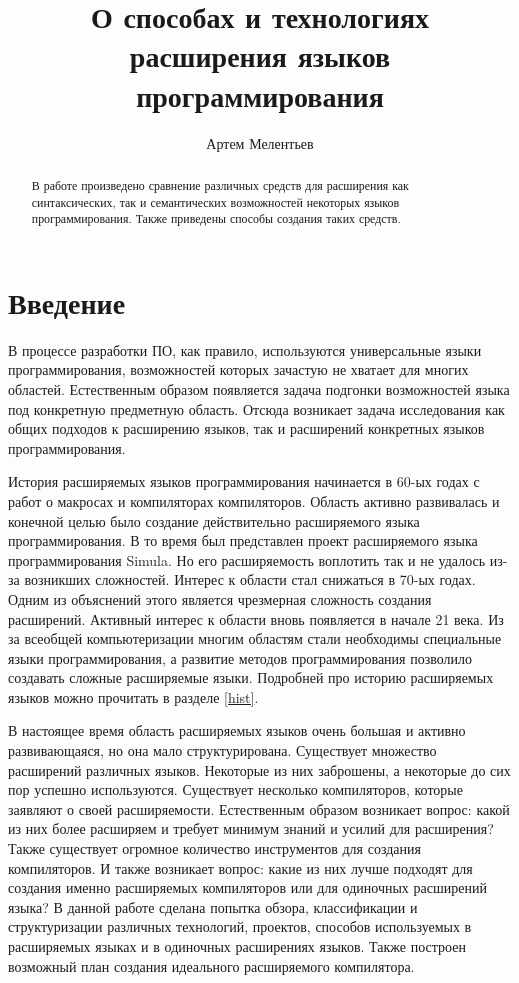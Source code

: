 \documentclass[a4paper,12pt]{article}
\begin{document}
\title{О способах и технологиях расширения языков программирования}
\author{Артем Мелентьев}
\maketitle

\begin{abstract}
В работе произведено сравнение различных средств для расширения как
синтаксических, так и семантических возможностей некоторых языков
программирования. Также приведены способы создания таких средств.
\end{abstract}

\tableofcontents

\pagebreak

\section{Введение}

В процессе разработки ПО, как правило, используются универсальные языки
программирования, возможностей которых зачастую не хватает для многих областей.
Естественным образом появляется задача подгонки возможностей языка под
конкретную предметную область. Отсюда возникает задача исследования как общих
подходов к расширению языков, так и расширений конкретных языков
программирования.

История расширяемых языков программирования начинается в 60-ых годах с работ о
макросах и компиляторах компиляторов. Область активно развивалась и конечной
целью было создание действительно расширяемого языка программирования. В
то время был представлен проект расширяемого языка программирования Simula. Но
его расширяемость воплотить так и не удалось из-за возникших сложностей.
Интерес к области стал снижаться в 70-ых годах. Одним из объяснений
этого является чрезмерная сложность создания расширений. Активный интерес к
области вновь появляется в начале 21 века. Из за всеобщей компьютеризации
многим областям стали необходимы специальные языки программирования, а развитие
методов программирования позволило создавать сложные расширяемые языки.
Подробней про историю расширяемых языков можно прочитать в разделе \ref{hist}.

В настоящее время область расширяемых языков очень большая и активно
развивающаяся, но она мало структурирована. Существует множество расширений
различных языков. Некоторые из них заброшены, а некоторые до сих пор успешно
используются. Существует несколько компиляторов, которые заявляют о своей
расширяемости. Естественным образом возникает вопрос: какой из них более
расширяем и требует минимум знаний и усилий для расширения? Также существует
огромное количество инструментов для создания компиляторов. И также возникает
вопрос: какие из них лучше подходят для создания именно расширяемых
компиляторов или для одиночных расширений языка? В данной работе сделана
попытка обзора, классификации и структуризации различных технологий, проектов,
способов используемых в расширяемых языках и в одиночных расширениях языков.
Также построен возможный план создания идеального расширяемого компилятора.
\end{document}
